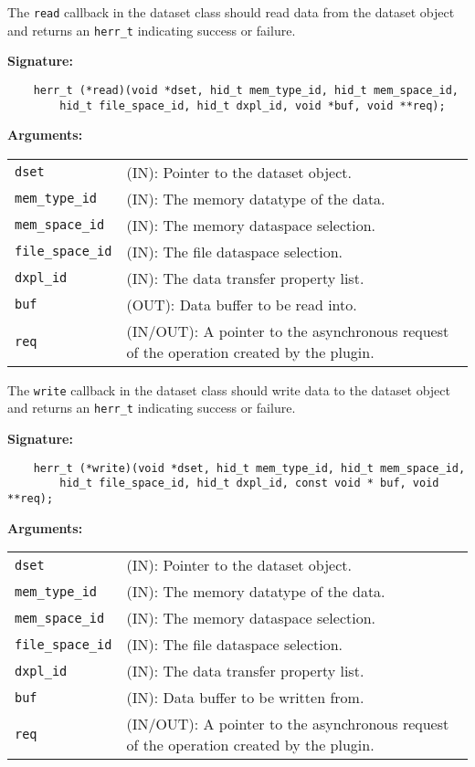 The {\tt read} callback in the dataset class should read data from
the dataset object and returns an {\tt herr\_t} indicating success or
failure.

\textbf{Signature:}
\begin{lstlisting}
    herr_t (*read)(void *dset, hid_t mem_type_id, hid_t mem_space_id, 
        hid_t file_space_id, hid_t dxpl_id, void *buf, void **req);
\end{lstlisting}

\textbf{Arguments:}\\
\begin{tabular}{l p{10cm}}
  {\tt dset} & (IN): Pointer to the dataset object.\\
  {\tt mem\_type\_id} & (IN): The memory datatype of the data.\\
  {\tt mem\_space\_id} & (IN): The memory dataspace selection.\\
  {\tt file\_space\_id} & (IN): The file dataspace selection.\\
  {\tt dxpl\_id} & (IN): The data transfer property list.\\
  {\tt buf} & (OUT): Data buffer to be read into.\\
  {\tt req} & (IN/OUT): A pointer to the asynchronous request of the
  operation created by the plugin.\\
\end{tabular}

The {\tt write} callback in the dataset class should write data to
the dataset object and returns an {\tt herr\_t} indicating success or
failure.

\textbf{Signature:}
\begin{lstlisting}
    herr_t (*write)(void *dset, hid_t mem_type_id, hid_t mem_space_id, 
        hid_t file_space_id, hid_t dxpl_id, const void * buf, void **req);
\end{lstlisting}

\textbf{Arguments:}\\
\begin{tabular}{l p{10cm}}
  {\tt dset} & (IN): Pointer to the dataset object.\\
  {\tt mem\_type\_id} & (IN): The memory datatype of the data.\\
  {\tt mem\_space\_id} & (IN): The memory dataspace selection.\\
  {\tt file\_space\_id} & (IN): The file dataspace selection.\\
  {\tt dxpl\_id} & (IN): The data transfer property list.\\
  {\tt buf} & (IN): Data buffer to be written from.\\
  {\tt req} & (IN/OUT): A pointer to the asynchronous request of the
  operation created by the plugin.\\
\end{tabular}

